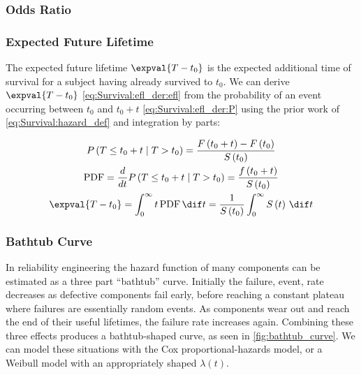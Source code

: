 \subsubsection{Odds Ratio}
\label{additional:Survival:additional:OR}

\subsubsection{Expected Future Lifetime}
\label{additional:Survival::additional:efl}

The expected future lifetime $\expval{T-t_{0}}$ is the
expected additional time of survival for a subject having already survived to $t_{0}$.
We can derive $\expval{T-t_{0}}$ \cref{eq:Survival:efl_der:efl}
from the probability of an event occurring between $t_{0}$ and $t_{0} + t$ \cref{eq:Survival:efl_der:P}
using the prior work of \cref{eq:Survival:hazard_def} and integration by parts:

\begin{subequations}\label{eq:Survival:efl_der}
\begin{gather}
P\left(T \leq t_{0} + t \mid T > t_{0}\right)
= \frac{F\left(t_{0} + t\right) - F\left(t_{0}\right)}{S\left(t_{0}\right)} \label{eq:Survival:efl_der:P} \\
\text{PDF}
= \frac{d}{dt} P\left(T \leq t_{0} + t \mid T > t_{0}\right)
= \frac{f\left(t_{0} + t\right)}{S\left(t_{0}\right)} \label{eq:Survival:efl_der:pdf} \\
\expval{T-t_{0}}
= \int_{0}^{\infty} t \, \text{PDF} \, \dif t
= \frac{1}{S\left(t_{0}\right)} \int_{0}^{\infty} S\left(t\right) \, \dif t \label{eq:Survival:efl_der:efl}
\end{gather}
\end{subequations}

\subsubsection{Bathtub Curve}
\label{additional:Survival:additional:bathtub}

In reliability engineering the hazard function of many components
can be estimated as a three part ``bathtub'' curve.
Initially the failure, \ie event, rate decreases as defective components fail early,
before reaching a constant plateau where failures are essentially random events.
As components wear out and reach the end of their useful lifetimes, the failure rate increases again.
Combining these three effects produces a bathtub-shaped curve, as seen in \cref{fig:bathtub_curve}.
We can model these situations with the Cox proportional-hazards model,
or a Weibull model with an appropriately shaped $\lambda\left(t\right)$.

